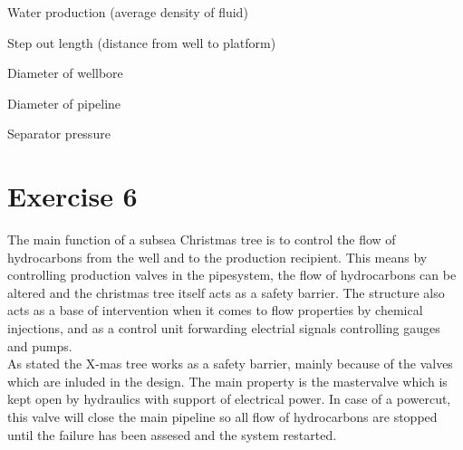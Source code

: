 \documentclass[a4paper,norsk]{article}
\begin{document}
Water production (average
density of fluid)

Step
out length (distance
from well to platform)

Diameter of wellbore

Diameter of pipeline

Separator pressure


\section*{Exercise 6}
The main function of a subsea Christmas tree is to control the flow of hydrocarbons from the well and to the production recipient. This means by controlling production valves in the pipesystem, the flow of hydrocarbons can be altered and the christmas tree itself acts as a safety barrier. The structure also acts as a base of intervention when it comes to flow properties by chemical injections, and as a control unit forwarding electrial signals controlling gauges and pumps. 
\\
As stated the X-mas tree works as a safety barrier, mainly because of the valves which are inluded in the design. The main property is the mastervalve which is kept open by hydraulics with support of electrical power. In case of a powercut, this valve will close the main pipeline so all flow of hydrocarbons are stopped until the failure has been assesed and the system restarted. 
\end{document}
